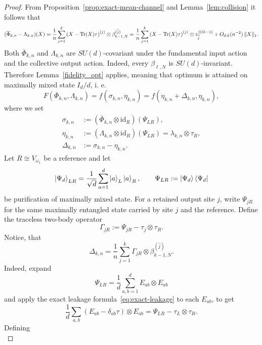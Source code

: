 \documentclass[10pt,twocolumn,superscriptaddress,aps,amsmath,amssymb,citeautoscript,floatfix,prx]{revtex4-2}
\theoremstyle{plain}
\theoremstyle{plain}
\theoremstyle{plain}
\theoremstyle{plain}
\theoremstyle{plain}
\theoremstyle{plain}
\newcommand{\id}{\mathrm{id}}
\theoremstyle{plain}
\theoremstyle{definition}
\theoremstyle{plain}
\begin{document}
\begin{appendix}
\begin{proof}
    From Proposition~\ref{prop:exact-mean-channel} and Lemma~\ref{lem:collision} it follows that
    \begin{equation}
    \label{eq:exact-leakage}
    (\overline\Phi_{k,n}-\Lambda_{k,n})(X)
    =\frac1n\sum_{j=1}^k
    \left(X-\Tr(X)\tau\right)^{(j)}
    \otimes\beta_{k-1,N}^{(\widehat j)}=\frac1n\sum_{j=1}^k
  \left(X-\Tr(X)\tau\right)^{(j)}
  \otimes\tau^{\otimes(k-1)}_{\widehat j}
  +O_{d,k}(n^{-2})\,\|X\|_1.
    \end{equation}
    Both $\overline\Phi_{k,n}$ and $\Lambda_{k,n}$ are $SU(d)$-covariant under the fundamental input action and the collective output action.  
    Indeed, every $\beta_{\ell,N}$ is $SU(d)$-invariant.  Therefore Lemma~\ref{fidelity_opt} applies,
    meaning that optimum is attained on maximally mixed state $I_d/d$, i. e.
    \[
        F(\overline\Phi_{k,n},\Lambda_{k,n})=f(\sigma_{k,n},\eta_{k,n})=f(\eta_{k,n}+\Delta_{k,n},\eta_{k,n}),
    \]
    where we set
    \begin{align}
    \sigma_{k,n}
    &:=(\overline\Phi_{k,n}\otimes\id_R)(\Psi_{LR}),\\
    \eta_{k,n}
    &:=(\Lambda_{k,n}\otimes\id_R)(\Psi_{LR})
        =\lambda_{k,n}\otimes\tau_R,\\
    \Delta_{k,n}&:=\sigma_{k,n}-\eta_{k,n}.
    \end{align}
    Let $R\cong V_{\omega_1}$ be a reference and let
    \[
    \ket{\Psi_d}_{LR}=\frac1{\sqrt d}\sum_{a=1}^d\ket a_L\ket a_R,
    \qquad
    \Psi_{LR}:=\ket{\Psi_d}\bra{\Psi_d}
    \]
    be purification of maximally mixed state.
    For a retained output site $j$, write $\Psi_{jR}$ for the same maximally entangled state carried by site $j$ and the reference.
    Define the traceless two-body operator
    \begin{equation}
    \label{eq:Gamma}
    \Gamma_{jR}:=\Psi_{jR}-\tau_j\otimes\tau_R.
    \end{equation}
    Notice, that
    \begin{equation}
    \label{eq:exact-choi-difference}
    \Delta_{k,n}
    =\frac1n\sum_{j=1}^k
    \Gamma_{jR}\otimes\beta_{k-1,N}^{(\widehat j)}.
    \end{equation}
    Indeed, expand
\[
  \Psi_{LR}=\frac1d\sum_{a,b=1}^d E_{ab}\otimes E_{ab}
\]
and apply the exact leakage formula~\eqref{eq:exact-leakage} to each $E_{ab}$, to get
\[
  \frac1d\sum_{a,b}
  (E_{ab}-\delta_{ab}\tau)\otimes E_{ab}
  =\Psi_{LR}-\tau_L\otimes\tau_R.
\]
Defining 
\begin{equation}

\end{equation}
\end{proof}
\end{appendix}
\end{document}
